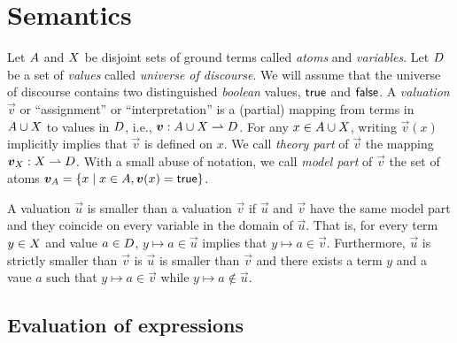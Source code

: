\section{Semantics}

Let $A$ and $X$ be disjoint sets of ground terms called \emph{atoms} and \emph{variables}. %
Let $D$ be a set of \emph{values} called \emph{universe of discourse}.
We will assume that the universe of discourse contains two distinguished \emph{boolean} values, $\textsf{true}$ and $\textsf{false}$. %
A \emph{valuation} $\vec{v}$ or ``assignment'' or ``interpretation'' is a (partial) mapping from terms in $A \cup X$ to values in $D$, i.e., $\bm{v}: A \cup X \rightharpoonup D$.
For any $x \in A \cup X$, writing $\vec{v}(x)$ implicitly implies that $\vec{v}$ is defined on $x$.
We call \emph{theory part} of $\vec{v}$ the mapping ${\bm{v}}_{X}: X \rightharpoonup D$.
With a small abuse of notation, we call \emph{model part} of $\vec{v}$ the set of atoms ${\bm{v}}_{A} = \{ x \mid x \in A, \bm{v}(x) = \textsf{true} \}$.

A valuation $\vec{u}$ is smaller than a valuation $\vec{v}$ if $\vec{u}$ and $\vec{v}$ have the same model part and they coincide on every variable in the domain of $\vec{u}$.
That is, for every term $y \in X$ and value $a \in D$, $y \mapsto a \in \vec{u}$ implies that $y \mapsto a \in \vec{v}$.
Furthermore, $\vec{u}$ is strictly smaller than $\vec{v}$ is $\vec{u}$ is smaller than $\vec{v}$ and there exists a term $y$ and a vaue $a$ such that $y \mapsto a \in \vec{v}$ while $y \mapsto a \notin \vec{u}$.


\subsection{Evaluation of expressions}

